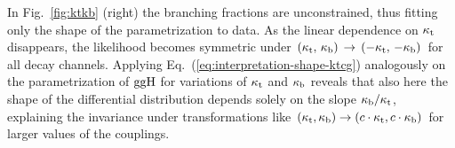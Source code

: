 In Fig.~\ref{fig:ktkb} (right) the branching fractions are unconstrained, thus fitting only the shape of the parametrization to data.
% 
As the linear dependence on $\kappa_{\mathrm{t}}$ disappears, the likelihood becomes symmetric under $(\kappa_{\mathrm{t}},\,\kappa_{\mathrm{b}}) \, \to \, (-\kappa_{\mathrm{t}},\,-\kappa_{\mathrm{b}})$ for all decay channels.
% 
Applying Eq.~(\ref{eq:interpretation-shape-ktcg}) analogously on the parametrization of $\mathrm{g}\mathrm{g}\mathrm{H}$ for variations of $\kappa_{\mathrm{t}}$ and $\kappa_{\mathrm{b}}$ reveals that also here the shape of the differential distribution depends solely on the slope $\kappa_{\mathrm{b}}/\kappa_{\mathrm{t}}$, explaining the invariance under transformations like $(\kappa_{\mathrm{t}}, \kappa_{\mathrm{b}}) \to (c \cdot \kappa_{\mathrm{t}}, c \cdot \kappa_{\mathrm{b}})$ for larger values of the couplings.



\begin{figure}[hbtp]
  \begin{center}
\end{center}
\end{figure}

